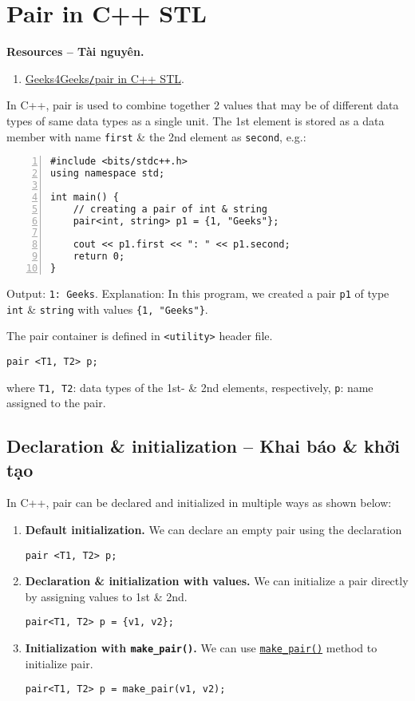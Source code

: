 \documentclass{article}
\begin{document}

\section{Pair in C++ STL}
\textbf{\textsf{Resources -- Tài nguyên.}}
\begin{enumerate}
	\item \href{https://www.geeksforgeeks.org/pair-in-cpp-stl/}{Geeks4Geeks{\tt/}pair in C++ STL}.
\end{enumerate}
In C++, pair is used to combine together 2 values that may be of different data types of same data types as a single unit. The 1st element is stored as a data member with name {\tt first} \& the 2nd element as {\tt second}, e.g.:
\begin{Verbatim}[numbers=left,xleftmargin=5mm]
#include <bits/stdc++.h>
using namespace std;

int main() {
    // creating a pair of int & string
    pair<int, string> p1 = {1, "Geeks"};
	
    cout << p1.first << ": " << p1.second;
    return 0;
}
\end{Verbatim}
Output: {\tt 1: Geeks}. Explanation: In this program, we created a pair {\tt p1} of type {\tt int} \& {\tt string} with values \verb|{1, "Geeks"}|.

 The pair container is defined in {\tt<utility>} header file.
\begin{verbatim}
pair <T1, T2> p;
\end{verbatim}
where {\tt T1, T2}: data types of the 1st- \& 2nd elements, respectively, {\tt p}: name assigned to the pair.


\subsection{Declaration \& initialization -- Khai báo \& khởi tạo}
In C++, pair can be declared and initialized in multiple ways as shown below:
\begin{enumerate}
	\item {\bf Default initialization.} We can declare an empty pair using the declaration
	\begin{verbatim}
pair <T1, T2> p;
	\end{verbatim}
	\item {\bf Declaration \& initialization with values.} We can initialize a pair directly by assigning values to 1st \& 2nd.
	\begin{verbatim}
pair<T1, T2> p = {v1, v2};
	\end{verbatim}
	\item {\bf Initialization with \verb|make_pair()|.} We can use \href{https://www.geeksforgeeks.org/std-make_pair-in-cpp/}{\tt make\_pair()} method to initialize pair.
	\begin{verbatim}
pair<T1, T2> p = make_pair(v1, v2);
	\end{verbatim}
\end{enumerate}
\end{document}
